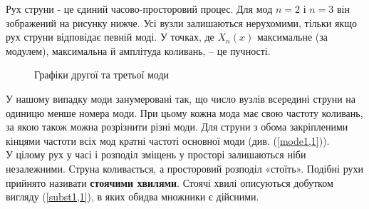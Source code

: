 Рух струни - це єдиний часово-просторовий процес. Для мод $n= 2$ і $n= 3$ він зображений на рисунку нижче. Усі вузли залишаються нерухомими, тільки якщо рух струни відповідає певній моді. У точках, де $X_n(x)$ максимальне (за модулем), максимальна й амплітуда коливань, -- це пучності.
\begin{figure}[h]
    \centering
    \caption{Графіки другої та третьої моди}
\end{figure}
У нашому випадку моди занумеровані так, що число вузлів всередині струни на одиницю менше номера моди. При цьому кожна мода має свою частоту коливань, за якою також можна розрізнити різні моди. Для струни з обома закріпленими кінцями частоти всіх мод кратні частоті основної моди (див. (\ref{mode1,1})).\\
У цілому рух у часі і розподіл зміщень у просторі залишаються ніби незалежними. Струна коливається, а просторовий розподіл «стоїть». Подібні рухи прийнято називати \textbf{стоячими хвилями}. Стоячі хвилі описуються добутком вигляду (\ref{subst1,1}), в яких обидва множники є дійсними.

%